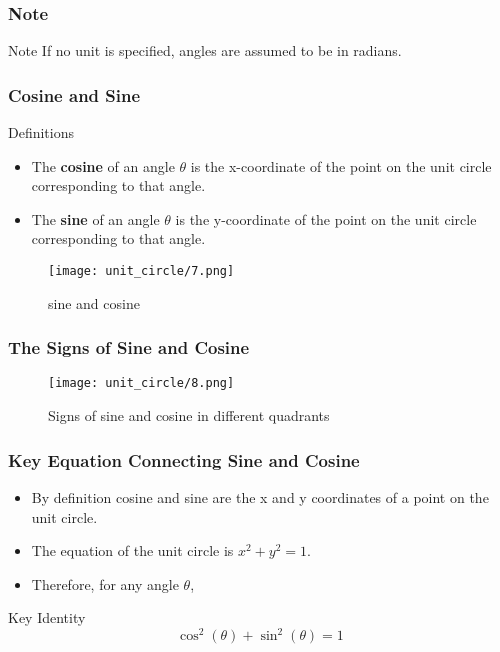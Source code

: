     \begin{frame}
        \frametitle{Note}
        \begin{block}{Note}
            If no unit is specified, angles are assumed to be in radians.
        \end{block}
    \end{frame}

    \begin{frame}
        \frametitle{Cosine and Sine}
        \begin{block}{Definitions}
            \begin{itemize}
                \item The \textbf{cosine} of an angle $\theta$ is the x-coordinate of the point on the unit circle corresponding to that angle.
                \item The \textbf{sine} of an angle $\theta$ is the y-coordinate of the point on the unit circle corresponding to that angle.
            \end{itemize}
        \end{block}     
        \begin{figure}[h]    
            \begin{minipage}[b]{0.8\textwidth}
            \centering
            \texttt{[image: unit\_circle/7.png]}
            \caption{sine and cosine}
        \end{minipage}
    \end{figure}
    \end{frame}

    \begin{frame}
        \frametitle{The Signs of Sine and Cosine} 
        \begin{figure}
            \centering
            \texttt{[image: unit\_circle/8.png]}
            \caption{Signs of sine and cosine in different quadrants}
        \end{figure}
    \end{frame}

    \begin{frame}
        \frametitle{Key Equation Connecting Sine and Cosine} 
        \begin{itemize}
            \item By definition cosine and sine are the x and y coordinates of a point on the unit circle.
            \item The equation of the unit circle is $x^2 + y^2 = 1$.
            \item Therefore, for any angle $\theta$,
        \end{itemize}
        \begin{block}{Key Identity}
            \[\cos^2(\theta) + \sin^2(\theta) = 1\]
        \end{block}
    \end{frame}

